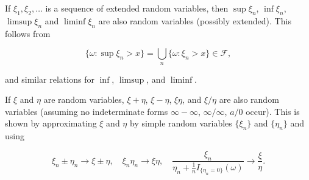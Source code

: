 If $\xi_1, \xi_2, \ldots$ is a sequence of extended random variables, then $\sup \xi_n$, $\inf \xi_n$, $\limsup \xi_n$ and $\liminf \xi_n$ are also random variables (possibly extended). This follows from

$$\{\omega : \sup \xi_n > x\} = \bigcup_n \{\omega : \xi_n > x\} \in \mathcal{F},$$

and similar relations for $\inf$, $\limsup$, and $\liminf$.

If $\xi$ and $\eta$ are random variables, $\xi + \eta$, $\xi - \eta$, $\xi \eta$, and $\xi/\eta$ are also random variables (assuming no indeterminate forms $\infty - \infty$, $\infty/\infty$, $a/0$ occur). This is shown by approximating $\xi$ and $\eta$ by simple random variables $\{\xi_n\}$ and $\{\eta_n\}$ and using

$$\xi_n \pm \eta_n \to \xi \pm \eta, \quad \xi_n \eta_n \to \xi \eta, \quad \frac{\xi_n}{\eta_n + \frac{1}{n} I_{\{\eta_n=0\}}(\omega)} \to \frac{\xi}{\eta}.$$
